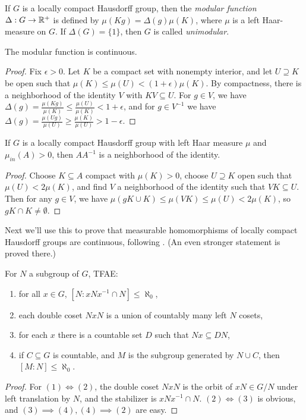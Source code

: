 \documentclass[letterpaper,11pt]{report}
\begin{document}
\begin{defn} If $G$ is a locally compact Hausdorff group, then the \emph{modular function} $\Delta : G \rightarrow \mathbb{R}^+$ is defined by $\mu(Kg) = \Delta(g)\mu(K)$, where $\mu$ is a left Haar-measure on $G$. If $\Delta(G) = \{1\}$, then $G$ is called \emph{unimodular}.
\end{defn}

\begin{prop} The modular function is continuous.
\end{prop}
\begin{proof} Fix $\epsilon > 0$. Let $K$ be a compact set with nonempty interior, and let $U \supseteq K$ be open such that $\mu(K) \le \mu(U) < (1+\epsilon)\mu(K)$. By compactness, there is a neighborhood of the identity $V$ with $KV \subseteq U$. For $g \in V$, we have $\Delta(g) = \frac{\mu(Kg)}{\mu(K)} \le \frac{\mu(U)}{\mu(K)} < 1 + \epsilon$, and for $g \in V^{-1}$ we have $\Delta(g) = \frac{\mu(Ug)}{\mu(U)} \ge \frac{\mu(K)}{\mu(U)} > 1-\epsilon$.
\end{proof}

\begin{prop}\label{big-difference} If $G$ is a locally compact Hausdorff group with left Haar measure $\mu$ and $\mu_{in}(A) > 0$, then $AA^{-1}$ is a neighborhood of the identity.
\end{prop}
\begin{proof} Choose $K \subseteq A$ compact with $\mu(K) > 0$, choose $U \supseteq K$ open such that $\mu(U) < 2\mu(K)$, and find $V$ a neighborhood of the identity such that $VK \subseteq U$. Then for any $g \in V$, we have $\mu(gK\cup K) \le \mu(VK) \le \mu(U) < 2\mu(K)$, so $gK \cap K \ne \emptyset$.
\end{proof}

Next we'll use this to prove that measurable homomorphisms of locally compact Hausdorff groups are continuous, following \cite{kleppner-measurable}. (An even stronger statement is proved there.)

\begin{lem}\label{asoo} For $N$ a subgroup of $G$, TFAE:
\begin{enumerate}
\item for all $x \in G$, $[N:xNx^{-1}\cap N] \le \aleph_0$,

\item each double coset $NxN$ is a union of countably many left $N$ cosets,

\item for each $x$ there is a countable set $D$ such that $Nx \subseteq DN$,

\item if $C \subseteq G$ is countable, and $M$ is the subgroup generated by $N \cup C$, then $[M:N] \le \aleph_0$.
\end{enumerate}
\end{lem}
\begin{proof} For $(1) \iff (2)$, the double coset $NxN$ is the orbit of $xN \in G/N$ under left translation by $N$, and the stabilizer is $xNx^{-1} \cap N$. $(2) \iff (3)$ is obvious, and $(3) \implies (4), (4) \implies (2)$ are easy.
\end{proof}
\end{document}
